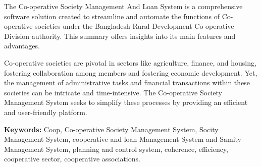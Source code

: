 The Co-operative Society Management And Loan System is a comprehensive software solution created to streamline and automate the functions of Co-operative societies under the Bangladesh Rural Development Co-operative Division authority. This summary offers insights into its main features and advantages.

Co-operative societies are pivotal in sectors like agriculture, finance, and housing, fostering collaboration among members and fostering economic development. Yet, the management of administrative tasks and financial transactions within these societies can be intricate and time-intensive. The Co-operative Society Management System seeks to simplify these processes by providing an efficient and user-friendly platform.






\vspace{8pt}
\textbf{Keywords:} Coop, Co-operative Society Management System, Socity Management System, cooperative and loan Management System and Samity Management System, planning and control system, coherence, efficiency, cooperative sector, cooperative associations.
